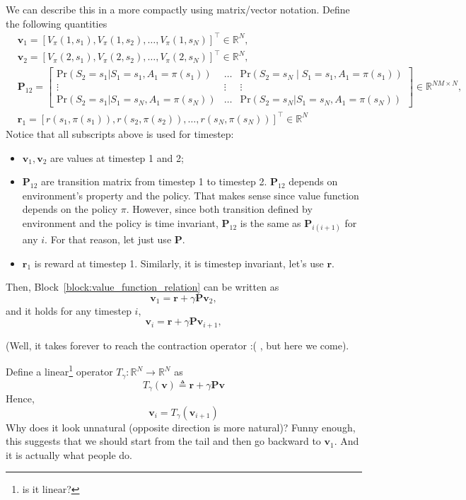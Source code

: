 \documentclass[11pt,a4paper]{article}
\def\red{\color{red}}
\newcommand{\T}{\!\top\!}
\theoremstyle{definition}
\newcounter{block_counter}
\theoremstyle{remark}
\begin{document}
We can describe this in a more compactly using matrix/vector notation. Define the following quantities
\begin{align*}
&\bm{v}_1 = [V_\pi(1, s_1), V_\pi(1, s_2), \ldots , V_\pi(1, s_{N})]^{\T} \in \mathbb{R}^{N},  \\
&\bm{v}_2 = [V_\pi(2, s_1), V_\pi(2, s_2), \ldots , V_\pi(2, s_{N})]^{\T} \in \mathbb{R}^{N},  \\
&\bm{P}_{12} = \begin{bmatrix}
    \text{Pr}(S_2=s_1| S_1=s_1, A_1=\pi(s_1)) & \ldots & \text{Pr}(S_2=s_{N} \mid S_1=s_1, A_1=\pi(s_1) ) \\
                                          \vdots & \vdots   & \vdots \\
      \text{Pr}(S_2=s_1 | S_1=s_N, A_1=\pi(s_N)) & \ldots & \text{Pr}(S_2=s_N | S_1=s_N, A_1=\pi(s_N)) 
\end{bmatrix}  \in \mathbb{R}^{NM \times N}, \\
& \bm{r}_1 = [r(s_1, \pi(s_1)), r(s_2, \pi(s_2)), \ldots , r(s_N, \pi(s_N))]^{\T} \in \mathbb{R}^{N}
\end{align*} 
Notice that all subscripts above is used for timestep:
\begin{itemize}
    \item $\bm{v}_1, \bm{v}_2$ are values at timestep 1 and 2;
    \item $\bm{P}_{12}$ are transition matrix from timestep 1 to timestep 2. $\bm{P}_{12}$ depends on environment's property and the policy. That makes sense since value function depends on the policy $\pi$. However, since both transition defined by environment and the policy is time invariant, $\bm{P}_{12}$ is the same as $\bm{P}_{i(i+1)}$ for any $i$. For that reason, let just use $\bm{P}$.
    \item $\bm{r}_1$ is reward at timestep 1. Similarly, it is timestep invariant, let's use $\bm{r}$.
\end{itemize}  
Then, Block~\ref{block:value_function_relation} can be written as
\[
\bm{v}_1 = \bm{r} + \gamma \bm{P} \bm{v}_2,
\] 
and it holds for any timestep $i$,
\[
\bm{v}_i = \bm{r} + \gamma \bm{P} \bm{v}_{i+1},
\] 

(Well, it takes forever to reach the contraction operator :( , but here we come).

Define a linear\footnote{is it linear?} operator $T_{\gamma}: \mathbb{R}^{N} \rightarrow \mathbb{R}^{N}$ as
\[
T_\gamma (\bm{v}) \triangleq \bm{r} + \gamma \bm{P} \bm{v}
\] 
Hence,
\[
\bm{v}_{i} = T_\gamma (\bm{v}_{i+1})
\] 
{\red Why does it look unnatural (opposite direction is more natural)?}
Funny enough, this suggests that we should start from the tail and then go backward to $\bm{v}_1$. And it is actually what people do.
\end{document}

